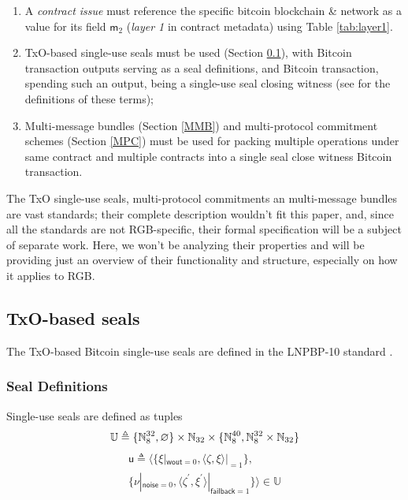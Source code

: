\documentclass[9pt,oneside]{amsart}
\begin{document}
\begin{multicols}{2}
\begin{enumerate}
\item A \emph{contract issue} must reference the specific bitcoin blockchain \& network
  as a value for its field $\mathsf{m}_2$ (\emph{layer 1} in contract metadata)
  using Table \ref{tab:layer1}.
\item TxO-based single-use seals must be used (Section \ref{Seals}),
  with Bitcoin transaction outputs serving as a seal definitions,
  and Bitcoin transaction, spending such an output, being a single-use seal closing witness
  (see \cite{LNPBP8} for the definitions of these terms);
\item Multi-message bundles (Section \ref{MMB})
  and multi-protocol commitment schemes (Section \ref{MPC}) must be used for packing
  multiple operations under same contract and multiple contracts
  into a single \gls{seal close witness} Bitcoin transaction.
\end{enumerate}

The TxO single-use seals, multi-protocol commitments an multi-message bundles are vast standards;
their complete description wouldn't fit this paper, and,
since all the standards are not RGB-specific,
their formal specification will be a subject of separate work.
Here, we won't be analyzing their properties and will be providing just an overview
of their functionality and structure, especially on how it applies to RGB.

\subsection{TxO-based seals}\label{Seals}

The TxO-based Bitcoin single-use seals are defined in the LNPBP-10 standard \cite{LNPBP10}.

\subsubsection{Seal Definitions}

Single-use seals are defined as tuples
\noindent
\begin{equation}
    \mathbb{U} \triangleq \{ \mathbb{N}_8^{32}, \varnothing \} \times \mathbb{N}_{32} \times \{ \mathbb{N}_8^{40}, \mathbb{N}_8^{32} \times \mathbb{N}_{32} \} \\
\end{equation}
\begin{multline}
    \mathsf{u} \triangleq \big\langle \{\xi|_{\mathsf{wout}=0}, \langle \zeta, \xi\rangle|_{=1} \}, \\
        \{\nu|_{\mathsf{noise}=0}, \langle \zeta^\prime, \xi^\prime\rangle|_{\mathsf{failback}=1} \} \big\rangle \in \mathbb{U}
\end{multline}


\end{multicols}
\end{document}
